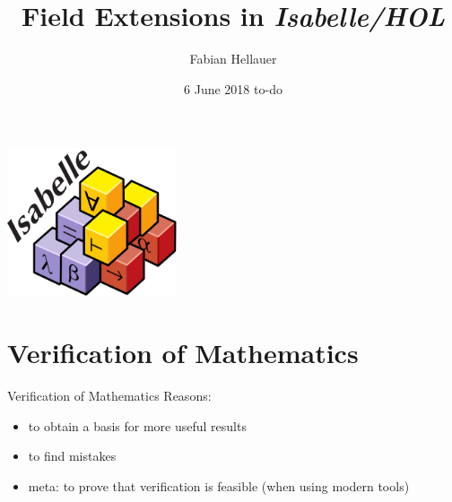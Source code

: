 \documentclass[%
	sans,
	12pt,
]{beamer}
\title{Field Extensions in \emph{Isabelle/HOL} \vspace*{-0.5em}}
\author{\normalsize Fabian Hellauer}
\institute[]{\footnotesize Technische Universität München}
\date{\footnotesize 6 June 2018 to-do}
\begin{document}
\maketitle

\begin{frame}
\begin{center}
\includegraphics[width=5cm]{isabelle.pdf}
\end{center}
\end{frame}

\tableofcontents

\newcommand{\pivot}[1]{{\color{red}#1}}
\newcommand{\ltpiv}[1]{{\color{blue}#1}}
\newcommand{\gtpiv}[1]{{\color{olive}#1}}

\section{Verification of Mathematics}
\begin{frame}{Verification of Mathematics}%
Reasons:
\begin{itemize}
	\item to obtain a basis for more useful results\pause
	\item to find mistakes\pause
	\item meta: to prove that verification %
	is feasible (when using modern tools)
\end{itemize}
\end{frame}
\end{document}
